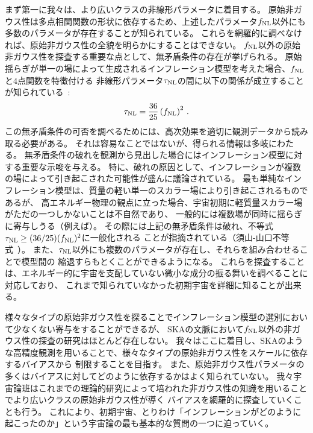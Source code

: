 \begin{enumerate}
\begin{description}
まず第一に我々は、より広いクラスの非線形パラメータに着目する。
原始非ガウス性は多点相関関数の形状に依存するため、上述したパラメータ$f_{\rm NL}$以外にも
多数のパラメータが存在することが知られている。
これらを網羅的に調べなければ、原始非ガウス性の全貌を明らかにすることはできない。
$f_{\rm NL}$以外の原始非ガウス性を探査する重要な点として、無矛盾条件の存在が挙げられる。
原始揺らぎが単一の場によって生成されるインフレーション模型を考えた場合、$f_{\rm NL}$と$4$点関数を特徴付ける
非線形パラメータ$\tau_{\rm NL}$の間に以下の関係が成立することが知られている~\citep{Boubekeur:2005fj,Okamoto:2002ik}:
\begin{align}
	\tau_{\rm NL}=\frac{36}{25}\left( f_{\rm NL}\right)^2
	\,.\label{eq:condition}
\end{align}
この無矛盾条件の可否を調べるためには、高次効果を適切に観測データから読み取る必要がある。
それは容易なことではないが、得られる情報は多岐にわたる。
無矛盾条件の破れを観測から見出した場合にはインフレーション模型に対する重要な示唆を与える。
特に、破れの原因として、インフレーションが複数の場によって引き起こされた可能性が盛んに議論されている。
最も単純なインフレーション模型は、質量の軽い単一のスカラー場により引き起こされるものであるが、
高エネルギー物理の観点に立った場合、宇宙初期に軽質量スカラー場がただの一つしかないことは不自然であり、
一般的には複数場が同時に揺らぎに寄与しうる（例えば\cite{Lyth:2001nq,Moroi:2001ct,Enqvist:2001zp}）。
その際には上記の無矛盾条件は破れ、不等式$\tau_{\rm NL}\geq (36/25)(f_{\rm NL})^2$に一般化される
ことが指摘されている（須山-山口不等式~\cite{Suyama:2007bg}）。
また、$\tau_{\rm NL}$以外にも複数のパラメータが存在し、それらを組み合わせることで模型間の
縮退すらもとくことができるようになる。
これらを探査することは、エネルギー的に宇宙を支配していない微小な成分の振る舞いを調べることに対応しており、
これまで知られていなかった初期宇宙を詳細に知ることが出来る。

様々なタイプの原始非ガウス性を探ることでインフレーション模型の選別において少なくない寄与をすることができるが、
SKAの文脈において$f_{\rm NL}$以外の非ガウス性の探査の研究はほとんど存在しない。
我々はここに着目し、SKAのような高精度観測を用いることで、様々なタイプの原始非ガウス性をスケールに依存するバイアスから
制限することを目指す。
また、原始非ガウス性パラメータの多くはバイアスに対してどのように依存するかはよく知られていない。
我々宇宙論班はこれまでの理論的研究によって培われた非ガウス性の知識を用いることでより広いクラスの原始非ガウス性が導く
バイアスを網羅的に探査していくことも行う。
これにより、初期宇宙、とりわけ「インフレーションがどのように起こったのか」という宇宙論の最も基本的な質問の一つに迫っていく。
\\



\end{description}
\end{enumerate}
